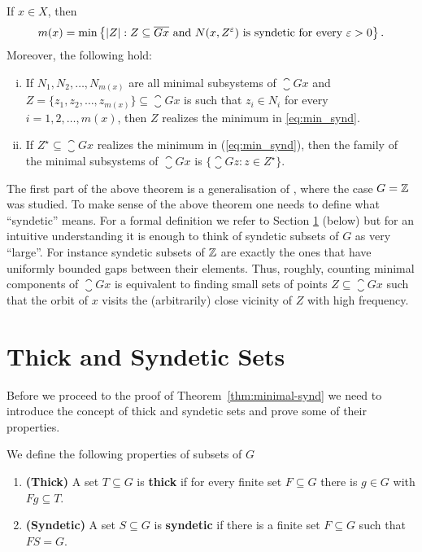 \begin{thm}\label{thm:minimal-synd}
If $x\in X$, then
\begin{equation}\label{eq:min_synd}
m(x) = \min\left\{|Z|: Z\subseteq \overline{Gx} \text{ and } N(x,Z^{\varepsilon}) \text{ is syndetic for every } \varepsilon>0 \right\}.
\end{equation}
Moreover, the following hold:
\begin{enumerate}[i)]
\item If $N_1,N_2,\ldots,N_{m(x)}$ are all minimal subsystems of $\closure{Gx}$ and $Z=\{z_1,z_2,\ldots,z_{m(x)}\}\subseteq \closure{Gx}$ is such that $z_i\in N_i$ for every $i=1,2,\ldots,m(x)$, then $Z$ realizes the minimum in \eqref{eq:min_synd}.
\item If $Z^\star \subseteq \closure{Gx}$ realizes the minimum in (\ref{eq:min_synd}), then the family of the minimal subsystems of $\closure{Gx}$ is $\{\closure{Gz}:z\in Z^\star\}$.\label{cond:thm_min_synd}
\end{enumerate}
\end{thm}
\noindent 
The first part of the above theorem is a generalisation of \cite[Lemma~1]{DI88}, where the case $G=\mathbb{Z}$ was studied.
%
To make sense of the above theorem one needs to define what ``syndetic'' means.
%
For a formal definition we refer to Section \ref{section:thick_synd} (below) but for an intuitive understanding it is enough to think of syndetic subsets of $G$ as very ``large''.
%
For instance syndetic subsets of $\mathbb{Z}$ are exactly the ones that have uniformly bounded gaps between their elements.
%
Thus, roughly, counting minimal components of $\closure{Gx}$ is equivalent to finding small sets of points $Z \subseteq \closure{Gx}$ such that the orbit of $x$ visits the (arbitrarily) close vicinity of $Z$ with high frequency.




\noindent


\section{Thick and Syndetic Sets}\label{section:thick_synd}
Before we proceed to the proof of Theorem~\ref{thm:minimal-synd} we need to introduce the concept of thick and syndetic sets and prove some of their properties.
\begin{defn} \label{def:synd_thick}
We define the following properties of subsets of $G$
\mbox{}
\begin{enumerate}
\item {\bf (Thick)} A set $T\subseteq G$ is {\bf thick} if for every finite set $F\subseteq G$ there is $g\in G$ with $Fg\subseteq T$.
\item {\bf (Syndetic)} A set $S\subseteq G$ is {\bf syndetic} if there is a finite set $F\subseteq  G$ such that $FS=G$.
\end{enumerate}
\end{defn}

